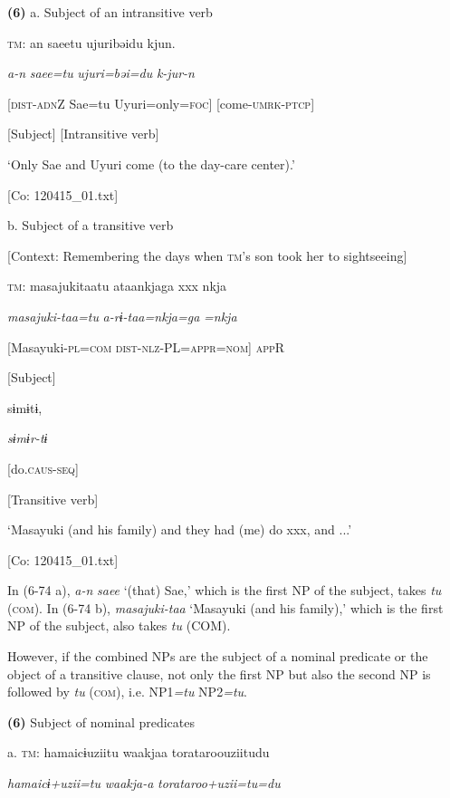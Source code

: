 \textbf{(6)}  a.  Subject of an intransitive verb

    \textsc{tm}:  an  saeetu  ujuribəidu  kjun.

      \textit{a-n}  \textit{saee=tu}  \textit{ujuri=bəi=du}  \textit{k-jur-n}

      [\textsc{dist}-\textsc{adn}Z  Sae=tu  Uyuri=only=\textsc{foc}]  [come-\textsc{umrk}-\textsc{ptcp}]

      [Subject]  [Intransitive verb]

      ‘Only Sae and Uyuri come (to the day-care center).’

      [Co: 120415\_01.txt]

  b.  Subject of a transitive verb

    [Context: Remembering the days when \textsc{tm}’s son took her to sightseeing]

    \textsc{tm}:  masajukitaatu  ataankjaga  xxx  nkja

      \textit{masajuki-taa=tu}  \textit{a-rɨ-taa=nkja=ga}    \textit{=nkja}

      [Masayuki-\textsc{pl}=\textsc{com}  \textsc{dist}-\textsc{nlz}-PL=\textsc{appr}=\textsc{nom}]    \textsc{app}R

      [Subject]    

      sɨmɨtɨ,

      \textit{sɨmɨr-tɨ}

      [do.\textsc{caus}-\textsc{seq}]

      [Transitive verb]

      ‘Masayuki (and his family) and they had (me) do xxx, and ...’

      [Co: 120415\_01.txt]

In (6-74 a), \textit{a-n} \textit{saee} ‘(that) Sae,’ which is the first NP of the subject, takes \textit{tu} (\textsc{com}). In (6-74 b), \textit{masajuki-taa} ‘Masayuki (and his family),’ which is the first NP of the subject, also takes \textit{tu} (COM).

  However, if the combined NPs are the subject of a nominal predicate or the object of a transitive clause, not only the first NP but also the second NP is followed by \textit{tu} (\textsc{com}), i.e. NP1\textit{=tu} NP2\textit{=tu}.

\textbf{(6)}  Subject of nominal predicates

  a.  \textsc{tm}:  hamaicɨuziitu  waakjaa  torataroouziitudu

      \textit{hamaicɨ+uzii=tu}  \textit{waakja-a}  \textit{torataroo+uzii=tu=du}

